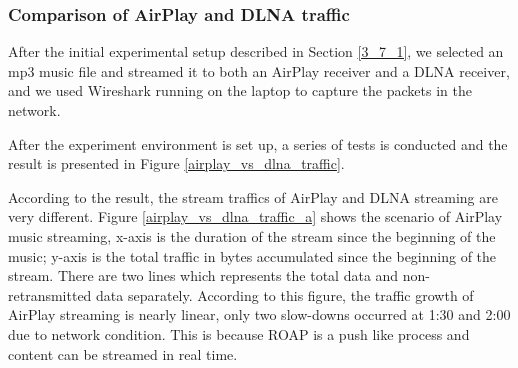 \subsubsection{Comparison of AirPlay and DLNA traffic\label{4_1_1}}
After the initial experimental setup described in Section \ref{3_7_1}, we
selected an mp3 music file and streamed it to both an AirPlay receiver
and a DLNA receiver, and we used Wireshark running on the laptop to capture the
packets in the network.

After the experiment environment is set up, a series of tests is conducted and
the result is presented in Figure \ref{airplay_vs_dlna_traffic}.

According to the result, the stream traffics of AirPlay and DLNA streaming are very different. Figure \ref{airplay_vs_dlna_traffic_a} shows the scenario of AirPlay music streaming, x-axis is the duration of the stream since the beginning of the music; y-axis is the
total traffic in bytes accumulated since the beginning of the stream. There are two lines which represents the total data and non-retransmitted data separately. According to this figure, the
traffic growth of AirPlay streaming is nearly linear, only two slow-downs occurred at 1:30 and 2:00 due to network condition. This is because ROAP is a push like process and content can be streamed in real time.

